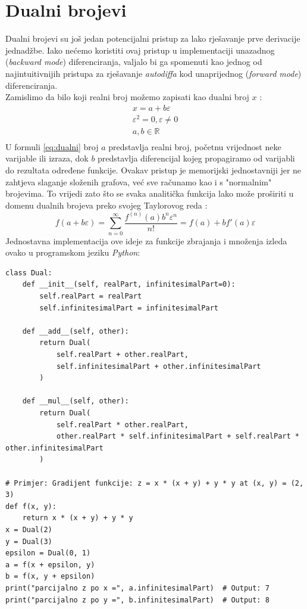 \documentclass[zavrsnirad]{fer}
\begin{document}
\section{Dualni brojevi}
Dualni brojevi su još jedan potencijalni pristup za lako rješavanje prve derivacije jednadžbe. Iako nećemo koristiti ovaj pristup u implementaciji unazadnog (\textit{backward mode}) diferenciranja, valjalo bi ga spomenuti kao jednog od najintuitivnijih pristupa za rješavanje \textit{autodiffa} kod unaprijednog (\textit{forward mode}) diferenciranja.
\\
Zamislimo da bilo koji realni broj možemo zapisati kao dualni broj $x$ \cite{hoffmann2016hitchhiker}:
\begin{equation}
  \begin{split}
  x = a + b \varepsilon \\
  \varepsilon ^ 2 = 0, \varepsilon \ne 0 \\
  a, b \in \mathbb{R} \\
  \end{split}
  \label{eq:dualni}
\end{equation}
U formuli \ref{eq:dualni} broj $a$ predstavlja realni broj, početnu vrijednost neke varijable ili izraza, dok $b$ predstavlja diferencijal kojeg propagiramo od varijabli do rezultata određene funkcije. Ovakav pristup je memorijski jednostavniji jer ne zahtjeva slaganje složenih grafova, već sve računamo kao i s "normalnim" brojevima. To vrijedi zato što se svaka analitička funkcija lako može proširiti u domenu dualnih brojeva preko svojeg Taylorovog reda \cite{hoffmann2016hitchhiker}:
\begin{equation}
  f(a + b \varepsilon) = \sum_{n=0}^{\infty} \frac{f^{(n)}(a) b^n \varepsilon^n}{n!} = f(a) + b f'(a) \varepsilon
\end{equation}
Jednostavna implementacija ove ideje za funkcije zbrajanja i množenja izleda ovako u programskom jeziku \textit{Python}:

\lstset{language=python}
\begin{lstlisting}[caption={Primjer korištenja dualnih brojeva za unaprijednu metodu \textit{autodiffa} \cite{wiki:autodiff}}]
class Dual:
    def __init__(self, realPart, infinitesimalPart=0):
        self.realPart = realPart
        self.infinitesimalPart = infinitesimalPart

    def __add__(self, other):
        return Dual(
            self.realPart + other.realPart,
            self.infinitesimalPart + other.infinitesimalPart
        )

    def __mul__(self, other):
        return Dual(
            self.realPart * other.realPart,
            other.realPart * self.infinitesimalPart + self.realPart * other.infinitesimalPart
        )

# Primjer: Gradijent funkcije: z = x * (x + y) + y * y at (x, y) = (2, 3)
def f(x, y):
    return x * (x + y) + y * y
x = Dual(2)
y = Dual(3)
epsilon = Dual(0, 1)
a = f(x + epsilon, y)
b = f(x, y + epsilon)
print("parcijalno z po x =", a.infinitesimalPart)  # Output: 7
print("parcijalno z po y =", b.infinitesimalPart)  # Output: 8
\end{lstlisting}
\end{document}
